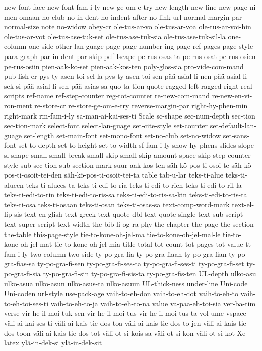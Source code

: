 {  new-font-face
  new-font-fam-i-ly
  new-ge-om-e-try
  new-length
  new-line
  new-page
  ni-men-omaan
  no-club
  no-in-dent
  no-indent-after
  no-link-url
  normal-margin-par
  normal-size
  note
  no-widow
  obey-cr
  ole-tus-ar-vo
  ole-tus-ar-voa
  ole-tus-ar-voi-hin
  ole-tus-ar-vot
  ole-tus-ase-tuk-set
  ole-tus-ase-tuk-sia
  ole-tus-ase-tuk-sil-la
  one-column
  one-side
  other-lan-guage
  page
  page-number-ing
  page-ref
  pages
  page-style
  para-graph
  par-in-dent
  par-skip
  pdf-lscape
  pe-rus-osas-ta
  pe-rus-osat
  pe-rus-osien
  pe-rus-osiin
  pien-aak-ko-set
  pien-aak-kos-ten
  poly-glos-sia
  pro-vide-com-mand
  pub-lish-er
  pys-ty-asen-toi-sel-la
  pys-ty-asen-toi-sen
  pää-asial-li-nen
  pää-asial-li-sek-si
  pää-asial-li-sen
  pää-asias-sa
  quo-ta-tion
  quote
  ragged-left
  ragged-right
  real-scripts
  ref-name
  ref-step-counter
  reg-tot-counter
  re-new-com-mand
  re-new-en-vi-ron-ment
  re-store-cr
  re-store-ge-om-e-try
  reverse-margin-par
  right-hy-phen-min
  right-mark
  rm-fam-i-ly
  sa-man-ai-kai-ses-ti
  Scale
  sc-shape
  sec-num-depth
  sec-tion
  sec-tion-mark
  select-font
  select-lan-guage
  set-cite-style
  set-counter
  set-default-lan-guage
  set-length
  set-main-font
  set-mono-font
  set-no-club
  set-no-widow
  set-sans-font
  set-to-depth
  set-to-height
  set-to-width
  sf-fam-i-ly
  show-hy-phens
  slides
  slope
  sl-shape
  small
  small-break
  small-skip
  small-skip-amount
  space-skip
  step-counter
  style
  sub-sec-tion
  sub-section-mark
  suur-aak-kos-ten
  säh-kö-pos-ti-osoi-te
  säh-kö-pos-ti-osoit-tei-den
  säh-kö-pos-ti-osoit-tei-ta
  table
  tab-u-lar
  teks-ti-alue
  teks-ti-alueen
  teks-ti-aluees-ta
  teks-ti-edi-to-ria
  teks-ti-edi-to-rien
  teks-ti-edi-to-ril-la
  teks-ti-edi-to-rin
  teks-ti-edi-to-ris-sa
  teks-ti-edi-to-ris-sa-kin
  teks-ti-edi-to-ris-ta
  teks-ti-osa
  teks-ti-osaan
  teks-ti-osan
  teks-ti-osas-sa
  text-comp-word-mark
  text-el-lip-sis
  text-en-glish
  text-greek
  text-quote-dbl
  text-quote-single
  text-sub-script
  text-super-script
  text-width
  the-bib-li-og-ra-phy
  the-chapter
  the-page
  the-section
  the-table
  this-page-style
  tie-to-kone-oh-jel-ma
  tie-to-kone-oh-jel-mal-le
  tie-to-kone-oh-jel-mat
  tie-to-kone-oh-jel-mia
  title
  total
  tot-count
  tot-pages
  tot-value
  tt-fam-i-ly
  two-column
  two-side
  ty-po-gra-fia
  ty-po-gra-fiaan
  ty-po-gra-fian
  ty-po-gra-fias-sa
  ty-po-gra-fi-sen
  ty-po-gra-fi-ses-ta
  ty-po-gra-fi-ses-ti
  ty-po-gra-fi-set
  ty-po-gra-fi-sia
  ty-po-gra-fi-sin
  ty-po-gra-fi-sis-ta
  ty-po-gra-fis-ten
  UL-depth
  ulko-asu
  ulko-asua
  ulko-asun
  ulko-asus-ta
  ulko-asuun
  UL-thick-ness
  under-line
  Uni-code
  Uni-coden
  url-style
  use-pack-age
  vaih-to-eh-don
  vaih-to-eh-dot
  vaih-to-eh-to
  vaih-to-eh-toi-ses-ti
  vaih-to-eh-to-ja
  vaih-to-eh-to-na
  value
  va-paa-eh-toi-sia
  ver-ba-tim
  verse
  vir-he-il-moi-tuk-sen
  vir-he-il-moi-tus
  vir-he-il-moi-tus-ta
  vol-ume
  vspace
  väli-ai-kai-ses-ti
  väli-ai-kais-tie-dos-toa
  väli-ai-kais-tie-dos-to-jen
  väli-ai-kais-tie-dos-toon
  väli-ai-kais-tie-dos-tot
  väli-ot-si-kois-sa
  väli-ot-si-kon
  väli-ot-si-kot
  Xe-latex
  ylä-in-dek-si
  ylä-in-dek-sit
}
